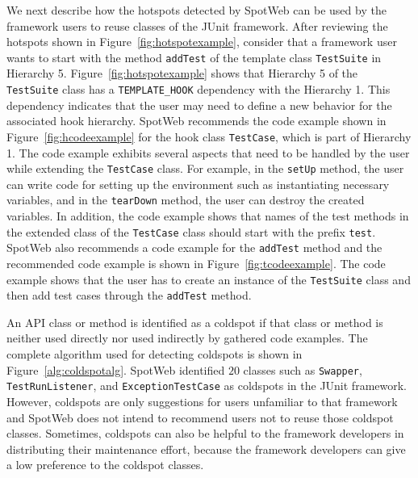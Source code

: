 \documentclass[conference]{IEEEtran}
\newcommand{\CodeIn}[1]{{\small\texttt{#1}}}
\begin{document}
We next describe how the hotspots detected by SpotWeb can be used by
the framework users to reuse classes of the JUnit framework. After reviewing
the hotspots shown in Figure~\ref{fig:hotspotexample}, consider that
a framework user wants to start with the method \CodeIn{addTest} of
the template class \CodeIn{TestSuite} in Hierarchy 5.
Figure~\ref{fig:hotspotexample} shows that Hierarchy 5 of the
\CodeIn{TestSuite} class has a \CodeIn{TEMPLATE\_HOOK} dependency
with the Hierarchy 1. This dependency indicates that the user may
need to define a new behavior for the associated hook hierarchy.
SpotWeb recommends the code example shown in
Figure~\ref{fig:hcodeexample} for the hook class \CodeIn{TestCase},
which is part of Hierarchy 1. The code example exhibits several
aspects that need to be handled by the user while extending the
\CodeIn{TestCase} class. For example, in the \CodeIn{setUp} method,
the user can write code for setting up the environment such as
instantiating necessary variables, and in the \CodeIn{tearDown}
method, the user can destroy the created variables. In addition, the code
example shows that names of the test methods in the extended class
of the \CodeIn{TestCase} class should start with the prefix \CodeIn{test}.
SpotWeb also recommends a code example for the \CodeIn{addTest} method and
the recommended code example is shown in
Figure~\ref{fig:tcodeexample}. The code example shows that the user
has to create an instance of the \CodeIn{TestSuite} class and then
add test cases through the \CodeIn{addTest} method.

An API class or method is identified as a coldspot if that class or method is neither
used directly nor used indirectly by gathered code examples. The complete
algorithm used for detecting coldspots is shown in Figure~\ref{alg:coldspotalg}. SpotWeb identified $20$
classes such as \CodeIn{Swapper}, \CodeIn{TestRunListener}, and \CodeIn{ExceptionTestCase} as coldspots
in the JUnit framework. However, coldspots are only suggestions
for users unfamiliar to that framework and SpotWeb does not intend to recommend users not to reuse
those coldspot classes. Sometimes, coldspots can also be helpful to
the framework developers in distributing their maintenance effort, because the framework
developers can give a low preference to the coldspot classes.
\end{document}
